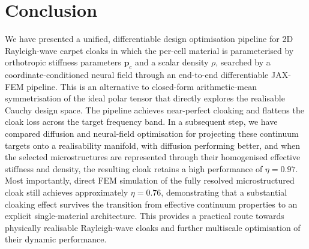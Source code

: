 \documentclass[preprint,12pt]{elsarticle}
\newcommand{\mbf}[1]{\mathbf{#1}}
\begin{document}
\section{Conclusion}\label{sec:conclusion}

We have presented a unified, differentiable design optimisation pipeline for
2D Rayleigh-wave carpet cloaks in which the per-cell
material is parameterised by orthotropic stiffness parameters $\mbf{p}_c$ and a scalar density $\rho$, searched by a coordinate-conditioned neural field through an end-to-end differentiable JAX-FEM pipeline. This is an alternative to closed-form arithmetic-mean
symmetrisation of the ideal polar tensor that directly explores the
realisable Cauchy design space. The pipeline achieves near-perfect cloaking and flattens the cloak loss across the target frequency band. In a subsequent step, we have compared diffusion and neural-field optimisation for projecting these continuum targets onto a realisability manifold, with diffusion performing better, and when the selected microstructures are represented through their homogenised effective stiffness and density, the resulting cloak retains a high performance of $\eta=0.97$. Most importantly, direct FEM simulation of the fully resolved microstructured cloak still achieves approximately $\eta=0.76$, demonstrating that a substantial cloaking effect survives the transition from effective continuum properties to an explicit single-material architecture. This provides a practical route towards physically realisable Rayleigh-wave cloaks and further multiscale optimisation of their dynamic performance.



\end{document}
